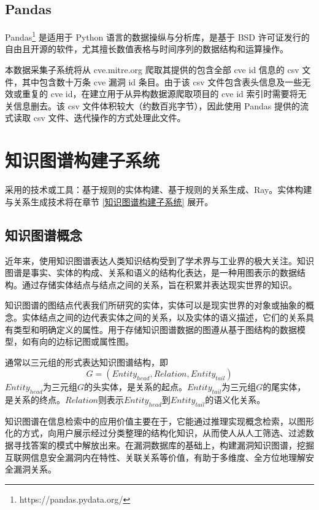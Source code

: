 \documentclass[a4paper,AutoFakeBold,oneside,12pt]{book}
\begin{document}
\subsection{Pandas}

Pandas\footnote{https://pandas.pydata.org/} 是适用于 Python 语言的数据操纵与分析库，是基于 BSD 许可证发行的自由且开源的软件，尤其擅长数值表格与时间序列的数据结构和运算操作。

本数据采集子系统将从 cve.mitre.org 爬取其提供的包含全部 cve id 信息的 csv 文件，其中包含数十万条 cve 漏洞 id 条目。由于该 csv 文件包含表头信息及一些无效或重复的 cve id，在建立用于从异构数据源爬取项目的 cve id 索引时需要将无关信息删去。该 csv 文件体积较大（约数百兆字节），因此使用 Pandas 提供的流式读取 csv 文件、迭代操作的方式处理此文件。

\section{知识图谱构建子系统}

采用的技术或工具：基于规则的实体构建、基于规则的关系生成、Ray。实体构建与关系生成技术将在章节 \ref{知识图谱构建子系统} 展开。

\subsection{知识图谱概念}

近年来，使用知识图谱表达人类知识结构受到了学术界与工业界的极大关注。知识图谱是事实、实体的构成、关系和语义的结构化表达，是一种用图表示的数据结构。通过存储实体结点与结点之间的关系，旨在积累并表达现实世界的知识。\cite{ji_survey_2022}

知识图谱的图结点代表我们所研究的实体，实体可以是现实世界的对象或抽象的概念。实体结点之间的边代表实体之间的关系，以及实体的语义描述，它们的关系具有类型和明确定义的属性。\cite{ji_survey_2022}用于存储知识图谱数据的图遵从基于图结构的数据模型，如有向的边标记图或属性图。\cite{hogan_knowledge_2022}

通常以三元组的形式表达知识图谱结构，即
$$G=(Entity_{head}, Relation, Entity_{tail})$$
$Entity_{head}$为三元组$G$的头实体，是关系的起点。$Entity_{tail}$为三元组$G$的尾实体，是关系的终点。$Relation$则表示$Entity_{head}$到$Entity_{tail}$的语义化关系。\cite{hogan_knowledge_2022}

知识图谱在信息检索中的应用价值主要在于，它能通过推理实现概念检索，以图形化的方式，向用户展示经过分类整理的结构化知识，从而使人从人工筛选、过滤数据寻找答案的模式中解放出来。在漏洞数据库的基础上，构建漏洞知识图谱，挖掘互联网信息安全漏洞内在特性、关联关系等价值，有助于多维度、全方位地理解安全漏洞关系。
\end{document}
